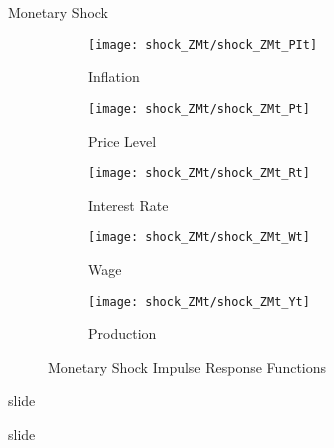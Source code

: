 \documentclass[
presentation.tex
]{subfiles}
\begin{document}
\begin{frame}{Monetary Shock}
	
	\begin{figure}[h!]
		\centering
		\begin{subfigure}[b]{0.3\textwidth}
			\centering
			\texttt{[image: shock\_ZMt/shock\_ZMt\_PIt]}
			\caption{Inflation}
			\label{fig:ZMt-inflation}
		\end{subfigure}
		\hfill
		\begin{subfigure}[b]{0.3\textwidth}
			\centering
			\texttt{[image: shock\_ZMt/shock\_ZMt\_Pt]}
			\caption{Price Level}
			\label{fig:ZMt-price}
		\end{subfigure}
		\hfill
		\begin{subfigure}[b]{0.3\textwidth}
			\centering
			\texttt{[image: shock\_ZMt/shock\_ZMt\_Rt]}
			\caption{Interest Rate}
			\label{fig:ZMt-interest-rate}
		\end{subfigure}
		\hfill
		
		\vspace*{0.5cm}
		
		\hfill
		\begin{subfigure}[b]{0.3\textwidth}
			\centering
			\texttt{[image: shock\_ZMt/shock\_ZMt\_Wt]}
			\caption{Wage}
			\label{fig:ZMt-wage}
		\end{subfigure}
		\hfill
		\begin{subfigure}[b]{0.3\textwidth}
			\centering
			\texttt{[image: shock\_ZMt/shock\_ZMt\_Yt]}
			\caption{Production}
			\label{fig:ZMt-production}
		\end{subfigure}
		\hfill
		\hfill
		\caption{Monetary Shock Impulse Response Functions}
		\label{fig:ZMt-irf}
	\end{figure}
	
\end{frame}


\begin{frame}{slide}
	
	slide
	
\end{frame}

\end{document}
